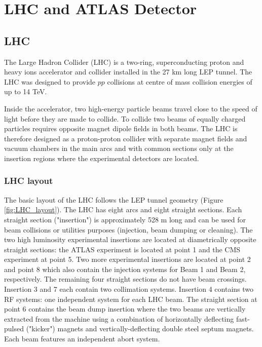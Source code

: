 \documentclass[a4paper, oneside, 11pt, openright]{book}
\begin{document}
		
	
	\chapter{LHC and ATLAS Detector}
		\section{LHC}
			The Large Hadron Collider (LHC) \cite{LHC_DESIGN_2008} is a two-ring, superconducting proton and heavy ions accelerator and collider installed in the 27 km long LEP \cite{LEP_DESIGN_2001} tunnel. The LHC was designed to provide $pp$ collisions at centre of mass collision energies of up to 14 TeV. 
			
			Inside the accelerator, two high-energy particle beams travel close to the speed of light before they are made to collide. To collide two beams of equally charged particles requires opposite magnet dipole fields in both beams. The LHC is therefore designed as a proton-proton collider with separate magnet fields and vacuum chambers in the main arcs and with common sections only at the insertion regions where the experimental detectors are located. 
		
			\subsection{LHC layout}
				The basic layout of the LHC \cite{LHC_DESIGN_2004} follows the LEP tunnel geometry (Figure \ref{fig:LHC_layout}). The LHC has eight arcs and eight straight sections. Each straight section ("insertion") is approximately 528 m long and can be used for beam collisions or utilities purposes (injection, beam dumping or cleaning). The two high luminosity experimental insertions are located at diametrically opposite straight sections: the {ATLAS} experiment is located at point 1 and the CMS experiment at point 5. Two more experimental insertions are located at point 2 and point 8 which also contain the injection systems for Beam 1 and Beam 2, respectively. The remaining four straight sections do not have beam crossings. Insertion 3 and 7 each contain two collimation systems. Insertion 4 contains two RF systems: one independent system for each LHC beam. The straight section at point 6 contains the beam dump insertion where the two beams are vertically extracted from the machine using a combination of horizontally deflecting fast-pulsed ("kicker") magnets and vertically-deflecting double steel septum magnets. Each beam features an independent abort system.
				
\end{document}

